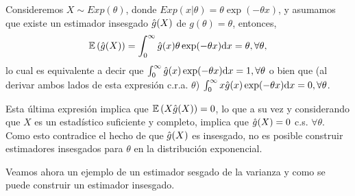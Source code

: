 \begin{example}
	\label{ex:estimador_exponancial}
	Consideremos $X\sim Exp(\theta)$, donde $Exp(x|\theta) = \theta\exp(-\theta x)$, y asumamos que existe un estimador insesgado ${ \hat{g}(X)}$ de $g(\theta) = \theta$, entonces, 
	\begin{equation}
		\mathbb{E} \left({ \hat{g}(X)}\right) = \int_0^\infty { \hat{g}(x)}\theta\exp(-\theta x){\text{d}} x = \theta, \forall \theta,
	\end{equation}
	lo cual es equivalente a decir que $\int_0^\infty { \hat{g}(x)}\exp(-\theta x){\text{d}} x = 1, \forall \theta$ o bien que (al derivar ambos lados de esta expresión c.r.a. $\theta$)  $\int_0^\infty x{ \hat{g}(x)}\exp(-\theta x){\text{d}} x = 0, \forall \theta$.

	Esta última expresión implica que $\mathbb{E} \left(X{ \hat{g}(X)}\right) = 0$, lo que a su vez y considerando que $X$ es un estadístico suficiente y completo, implica que ${ \hat{g}(X)}=0$ c.s. $\forall \theta$. Como esto contradice el hecho de que ${ \hat{g}(X)}$ es insesgado, no es posible construir estimadores insesgados para $\theta$ en la distribución exponencial.
\end{example}


Veamos ahora un ejemplo de un estimador sesgado de la varianza y como se puede construir un estimador insesgado. 

